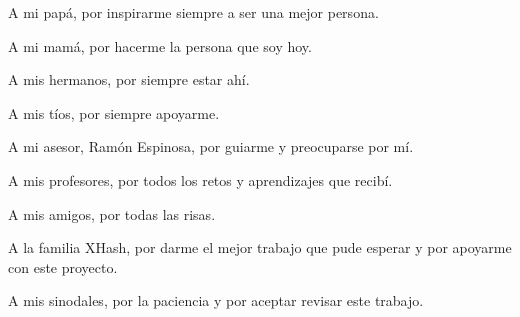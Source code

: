\documentclass[11pt, oneside]{book}
\begin{document}
A mi papá, por inspirarme siempre a ser una mejor persona.

A mi mamá, por hacerme la persona que soy hoy.

A mis hermanos, por siempre estar ahí.

A mis tíos, por siempre apoyarme. 

A mi asesor, Ramón Espinosa, por guiarme y preocuparse por mí. 

A mis profesores, por todos los retos y aprendizajes que recibí.

A mis amigos, por todas las risas. 


A la familia XHash, por darme el mejor trabajo que pude esperar y por apoyarme con este proyecto. 

A mis sinodales, por la paciencia y por aceptar revisar este trabajo.  
\end{document}
